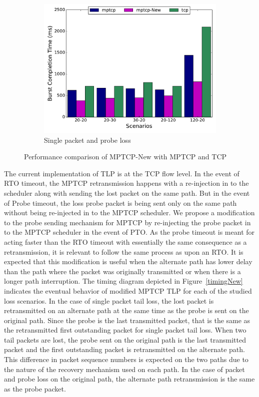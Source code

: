 \documentclass[10pt,conference]{IEEEtran}
\begin{document}
\begin{figure}
\begin{subfigure}[b]{0.32\textwidth}
\includegraphics[angle=0, width=\textwidth, natwidth=578.16,natheight=433.62]{plots/1PPNew.pdf}
\caption{Single packet and probe loss}\label{1ppn}
\end{subfigure}
\caption{Performance comparison of MPTCP-New with MPTCP and TCP}\label{mpnew}
\end{figure}

The current implementation of TLP is at the TCP flow level. In the event of RTO timeout, the MPTCP retransmission happens with a re-injection in 
to the scheduler along with sending the lost packet on the same path. But in the event of Probe timeout, the loss probe packet is being sent only on 
the same path without being re-injected in to the MPTCP scheduler. We propose a modification to the probe sending mechanism for MPTCP by re-injecting 
the probe packet in to the MPTCP scheduler in the event of PTO. As the probe timeout is meant for acting faster than the RTO timeout with 
essentially the same consequence as a retransmission, it is relevant to follow the same process as upon an RTO. It is expected that this 
modification is useful when the alternate path has lower delay than the path where the packet was originally transmitted or when there is a longer path 
interruption. The timing diagram depicted in Figure~\ref{timingNew} indicates the eventual behavior of modified MPTCP TLP for each of the studied 
loss scenarios. In the case of single packet tail loss, the lost packet is retransmitted on an alternate path at the same time as the probe 
is sent on the original
path. Since the probe is the last transmitted packet, that is the same as the retransmitted first outstanding packet for single packet tail loss. When two tail packets are lost, the
probe sent on the original path is the last transmitted packet and the first outstanding packet is retransmitted on the alternate path. This difference in packet
sequence numbers is expected on the two paths due to the nature of the recovery mechanism used on each path. In the case of packet and probe loss on the 
original path, the alternate path retransmission is the same as the probe packet.
\end{document}
